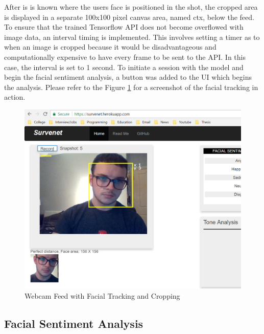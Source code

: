 After is is known where the users face is positioned in the shot, the cropped area is displayed in a separate 100x100 pixel canvas area, named ctx, below the feed. To ensure that the trained Tensorflow API does not become overflowed with image data, an interval timing is implemented. This involves setting a timer as to when an image is cropped because it would be disadvantageous and computationally expensive to have every frame to be sent to the API. In this case, the interval is set to 1 second. To initiate a session with the model and begin the facial sentiment analysis, a button was added to the UI which begins the analysis. Please refer to the Figure \ref{web} for a screenshot of the facial tracking in action.

\begin{figure}[ht]
	\begin{center}
		\advance\leftskip-3cm
		\advance\rightskip-3cm
		\includegraphics[keepaspectratio=true,scale=0.5]{__resources/implementation/webapp1.png}
		\caption{Webcam Feed with Facial Tracking and Cropping}
		\label{web}
	\end{center}
\end{figure}


\subsection{Facial Sentiment Analysis} 


